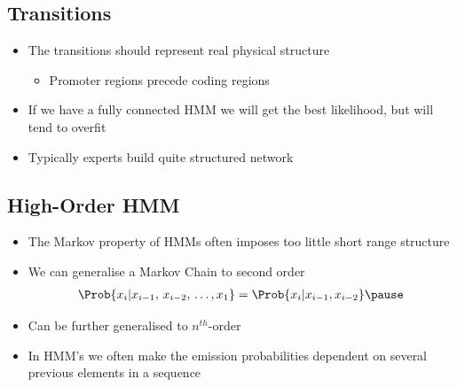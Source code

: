 
\begin{slide}
\section{Transitions}

\begin{PauseHighLight}
  \begin{itemize}
  \item The transitions should represent real physical structure
    \begin{itemize}
    \item Promoter regions precede coding regions\pause
    \end{itemize}
  \item If we have a fully connected HMM we will get the best
    likelihood, but will tend to overfit\pause
  \item Typically experts build quite structured network\pause
  \end{itemize}
\end{PauseHighLight}

\end{slide}


\begin{slide}
\section{High-Order HMM}

\begin{PauseHighLight}
  \begin{itemize}
  \item The Markov property of HMMs often imposes too little short range
    structure\pause
  \item We can generalise a Markov Chain to second order
    \begin{align*}
      \Prob{x_i|x_{i-1},\,x_{i-2},\,\ldots,x_1} 
      = \Prob{x_i| x_{i-1}, x_{i-2}}\pause
    \end{align*}
  \item Can be further generalised to $n^{th}$-order\pause
  \item In HMM's we often make the emission probabilities dependent on
    several previous elements in a sequence\pause
  \end{itemize}
\end{PauseHighLight}

\end{slide}

